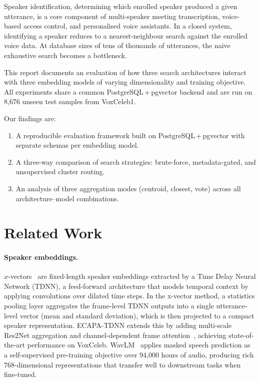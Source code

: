 \documentclass[12pt, a4paper]{article}
\begin{document}
Speaker identification, determining which enrolled speaker produced
a given utterance, is a core component of multi-speaker meeting
transcription, voice-based access control, and personalised voice
assistants.
In a closed system, identifying a speaker reduces to a nearest-neighbour search against the enrolled voice data.
At database sizes of tens of thousands of utterances, the naive exhaustive search becomes a bottleneck.

This report documents an evaluation of how three search
architectures interact with three embedding models of varying
dimensionality and training objective.
All experiments share a common PostgreSQL\,+\,pgvector backend
and are run on 8,676 unseen test samples from VoxCeleb1.

Our findings are:
\begin{enumerate}
  \item A reproducible evaluation framework built on PostgreSQL\,+\,pgvector
        with separate schemas per embedding model.
  \item A three-way comparison of search strategies: brute-force,
        metadata-gated, and unsupervised cluster routing.
  \item An analysis of three aggregation modes (centroid, closest,
        vote) across all architecture--model combinations.
\end{enumerate}

\section{Related Work}
\label{sec:related}

\paragraph{Speaker embeddings.}
$x$-vectors~\cite{snyder2018xvector} are fixed-length speaker embeddings
extracted by a Time Delay Neural Network (TDNN), a feed-forward
architecture that models temporal context by applying convolutions
over dilated time steps.
In the x-vector method, a statistics pooling layer aggregates the frame-level TDNN outputs
into a single utterance-level vector (mean and standard deviation),
which is then projected to a compact speaker representation.
ECAPA-TDNN extends this by adding
multi-scale Res2Net aggregation and channel-dependent frame attention~\cite{desplanques2020ecapa}, achieving state-of-the-art performance on VoxCeleb.
WavLM~\cite{chen2022wavlm} applies masked speech prediction as a
self-supervised pre-training objective over 94,000 hours of audio,
producing rich 768-dimensional representations that transfer well
to downstream tasks when fine-tuned.
\end{document}
